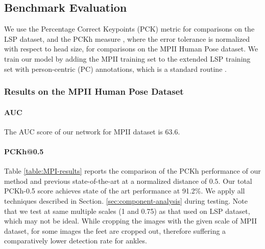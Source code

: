 \documentclass[journal ]{IEEEtran}
\begin{document}
\subsection{Benchmark Evaluation}


We use the Percentage Correct Keypoints (PCK) \cite{yang2013articulated} metric for comparisons on the LSP dataset, and the PCKh measure \cite{andriluka20142d}, where the error tolerance is normalized with respect to head size, for comparisons on the MPII Human Pose dataset.
We train our model by adding the MPII training set to the extended LSP training set with person-centric (PC) annotations, which is a standard routine \cite{belagiannis2016recurrent, pishchulin2016deepcut, insafutdinov2016deepercut, wei2016convolutional}. 

\subsubsection{Results on the MPII Human Pose Dataset}

\paragraph{AUC}
The AUC score of our network for MPII dataset is $63.6$.

\paragraph{PCKh@0.5}

Table \ref{table:MPI-results} reports the comparison of the PCKh performance of our method and previous state-of-the-art at a normalized distance of $0.5$.
Our total PCKh-0.5 score achieves state of the art performance at 91.2\%. We apply all techniques described in Section. \ref{sec:component-analysis} during testing. Note that we test at same multiple scales (1 and 0.75) as that used on LSP dataset, which may not be ideal. While cropping the images with the given scale of MPII dataset, for some images the feet are cropped out, therefore suffering a comparatively lower detection rate for ankles.
\end{document}
